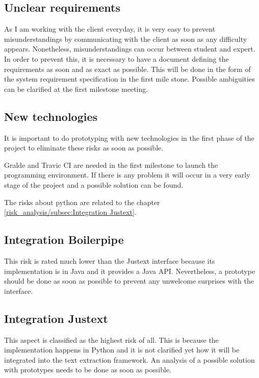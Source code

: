 \subsection{Unclear requirements}

As I am working with the client everyday, it is very easy to prevent misunderstandings by communicating with the client as soon as any difficulty appears. Nonetheless, misunderstandings can occur between student and expert. In order to prevent this, it is necessary to have a document defining the requirements as soon and as exact as possible. This will be done in the form of the system requirement specification in the first mile stone. Possible ambiguities can be clarified at the first milestone meeting.

\subsection{New technologies}

It is important to do prototyping with new technologies in the first phase of the project to eliminate these risks as soon as possible.

Gralde and Travic CI are needed in the first milestone to launch the programming environment. If there is any problem it will occur in a very early stage of the project and a possible solution can be found.

The risks about python are related to the chapter \ref{risk_analysis/subsec:Integration Justext}.

\subsection{Integration Boilerpipe}

This risk is rated much lower than the Justext interface because its implementation is in Java and it provides a Java API. Nevertheless, a prototype should be done as soon as possible to prevent any unwelcome surprises with the interface.

\subsection{Integration Justext}
\label{subsec:Integration Justext}

This aspect is classified as the highest risk of all. This is because the implementation happens in Python and it is not clarified yet how it will be integrated into the text extraction framework. An analysis of a possible solution with prototypes needs to be done as soon as possible.

